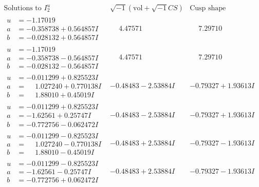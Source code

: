 \documentclass[1p]{elsarticle_modified}
\theoremstyle{definition}
\newcommand{\I}{\sqrt{-1}}
\begin{document}
$$\begin{array}{c|c|c}  
\text{Solutions to }I^u_{2}& \I (\text{vol} + \sqrt{-1}CS) & \text{Cusp shape}\\
 \hline 
\begin{aligned}
u &= -1.17019\phantom{ +0.000000I} \\
a &= -0.358738 + 0.564857 I \\
b &= -0.028132 + 0.564857 I\end{aligned}
 & \phantom{-}4.47571\phantom{ +0.000000I} & \phantom{-}7.29710\phantom{ +0.000000I} \\ \hline\begin{aligned}
u &= -1.17019\phantom{ +0.000000I} \\
a &= -0.358738 - 0.564857 I \\
b &= -0.028132 - 0.564857 I\end{aligned}
 & \phantom{-}4.47571\phantom{ +0.000000I} & \phantom{-}7.29710\phantom{ +0.000000I} \\ \hline\begin{aligned}
u &= -0.011299 + 0.825523 I \\
a &= \phantom{-}1.027240 + 0.770138 I \\
b &= \phantom{-}1.88010 + 0.45019 I\end{aligned}
 & -0.48483 - 2.53884 I & -0.79327 + 1.93613 I \\ \hline\begin{aligned}
u &= -0.011299 + 0.825523 I \\
a &= -1.62561 + 0.25747 I \\
b &= -0.772756 - 0.062472 I\end{aligned}
 & -0.48483 - 2.53884 I & -0.79327 + 1.93613 I \\ \hline\begin{aligned}
u &= -0.011299 - 0.825523 I \\
a &= \phantom{-}1.027240 - 0.770138 I \\
b &= \phantom{-}1.88010 - 0.45019 I\end{aligned}
 & -0.48483 + 2.53884 I & -0.79327 - 1.93613 I \\ \hline\begin{aligned}
u &= -0.011299 - 0.825523 I \\
a &= -1.62561 - 0.25747 I \\
b &= -0.772756 + 0.062472 I\end{aligned}
 & -0.48483 + 2.53884 I & -0.79327 - 1.93613 I \\ \hline\begin{aligned}

\end{aligned}
\end{array}$$
\end{document}
